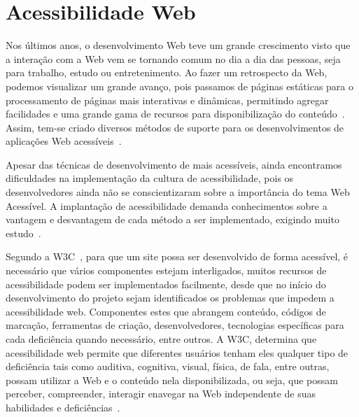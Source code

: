 \section{Acessibilidade Web}
\label{sec:acessibilidadeweb}


Nos \'ultimos anos, o desenvolvimento Web teve um grande crescimento visto que
a intera\c{c}\~ao com a Web vem se tornando comum no dia a dia das pessoas, seja para
trabalho, estudo ou entretenimento. Ao fazer um retrospecto da Web, podemos
visualizar um grande avan\c{c}o, pois passamos de p\'aginas est\'aticas para o
processamento de p\'aginas mais interativas e din\^amicas, permitindo agregar
facilidades e uma grande gama de recursos para disponibiliza\c{c}\~ao do
conte\'udo~\cite{Jazayeri}. Assim, tem-se criado diversos m\'etodos de suporte
para os desenvolvimentos de aplica\c{c}\~oes Web acess\'iveis~\cite{Freire}.

Apesar das t\'ecnicas de desenvolvimento de mais acess\'iveis, ainda encontramos
dificuldades na implementa\c{c}\~ao da cultura de acessibilidade, pois os
desenvolvedores ainda n\~ao se conscientizaram sobre a import\^ancia do tema Web
Acess\'ivel. A implanta\c{c}\~ao de acessibilidade demanda conhecimentos sobre
a vantagem e desvantagem de cada m\'etodo a ser implementado, exigindo muito estudo~\cite{Freire}.    
 
Segundo a W3C~\cite{WAI}, para que um site possa ser desenvolvido de forma
acess\'ivel, \'e necess\'ario que v\'arios componentes estejam interligados, muitos recursos de
acessibilidade podem ser implementados facilmente, desde que no in\'icio do
desenvolvimento do projeto sejam identificados os problemas que impedem a
acessibilidade web. Componentes estes que abrangem conte\'udo, c\'odigos de
marca\c{c}\~ao, ferramentas de cria\c{c}\~ao, desenvolvedores, tecnologias
espec\'ificas para cada defici\^encia quando necess\'ario, entre outros. A W3C, 
determina que acessibilidade web permite que diferentes usu\'arios tenham eles
qualquer tipo de defici\^encia tais como auditiva, cognitiva, visual,
f\'isica, de fala, entre outras, possam utilizar a Web e o conte\'udo nela
disponibilizada, ou seja, que possam perceber, compreender, interagir enavegar
na Web independente de suas habilidades e defici\^encias~\cite{WAI/W3C}.

